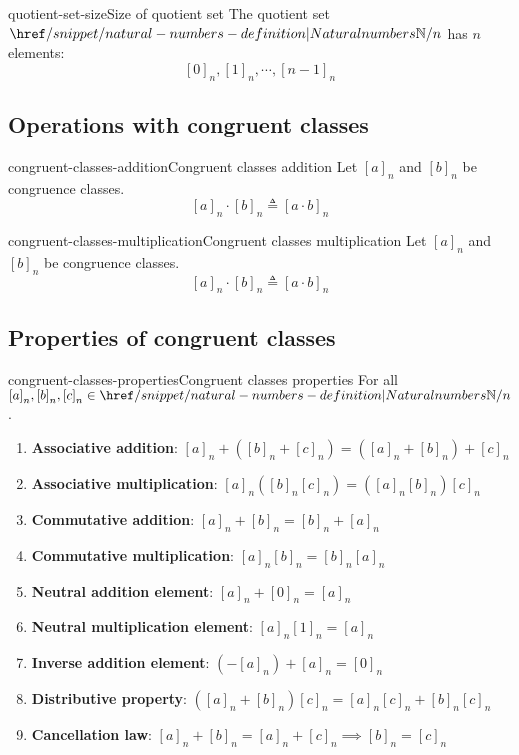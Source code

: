 \documentclass[preview]{standalone}
\begin{document}
\begin{snippetproposition}{quotient-set-size}{Size of quotient set}
    The quotient set \(\naturalnumbers / n\) has \(n\) elements:
    \[
        {[0]}_n,{[1]}_n,\cdots,{[n-1]}_n
    \]
\end{snippetproposition}

\subsection{Operations with congruent classes}

\begin{snippetdefinition}{congruent-classes-addition}{Congruent classes addition}
    Let \({[a]}_n\) and \({[b]}_n\) be congruence classes.  
    \[{[a]}_n \cdot {[b]}_n \triangleq {[a \cdot b]}_n\]
\end{snippetdefinition}

\begin{snippetdefinition}{congruent-classes-multiplication}{Congruent classes multiplication}
    Let \({[a]}_n\) and \({[b]}_n\) be congruence classes.  
    \[{[a]}_n \cdot {[b]}_n \triangleq {[a \cdot b]}_n\]
\end{snippetdefinition}

\subsection{Properties of congruent classes}

\begin{snippetproposition}{congruent-classes-properties}{Congruent classes properties}    
    For all \({[a]}_n, {[b]}_n, {[c]}_n \in \naturalnumbers/n\).

    \begin{enumerate}
        \item \textbf{Associative addition}: \({[a]}_n + ({[b]}_n + {[c]}_n) = ({[a]}_n + {[b]}_n) + {[c]}_n\)
        \item \textbf{Associative multiplication}: \({[a]}_n ({[b]}_n {[c]}_n) = ({[a]}_n {[b]}_n) {[c]}_n\)
        \item \textbf{Commutative addition}: \({[a]}_n + {[b]}_n = {[b]}_n + {[a]}_n\)
        \item \textbf{Commutative multiplication}: \({[a]}_n {[b]}_n = {[b]}_n {[a]}_n\)
        \item \textbf{Neutral addition element}: \({[a]}_n + {[0]}_n = {[a]}_n\)
        \item \textbf{Neutral multiplication element}: \({[a]}_n {[1]}_n = {[a]}_n\)
        \item \textbf{Inverse addition element}: \((-{[a]}_n) + {[a]}_n = {[0]}_n\)
        \item \textbf{Distributive property}: \(({[a]}_n + {[b]}_n) {[c]}_n = {[a]}_n{[c]}_n + {[b]}_n{[c]}_n\)
        \item \textbf{Cancellation law}: \({[a]}_n + {[b]}_n = {[a]}_n + {[c]}_n \implies {[b]}_n = {[c]}_n\)
    \end{enumerate}
\end{snippetproposition}
\end{document}
